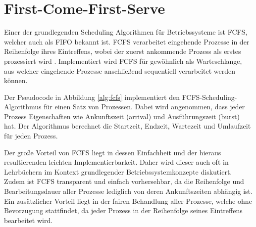 
\section{First-Come-First-Serve}

Einer der grundlegenden Scheduling Algorithmen für Betriebssysteme ist \ac{FCFS}, welcher auch als \ac{FIFO} bekannt ist. \ac{FCFS} verarbeitet eingehende Prozesse in der Reihenfolge ihres Eintreffens, wobei der zuerst ankommende Prozess als erstes prozessiert wird \cite{ANTHONY201621}.
Implementiert wird \ac{FCFS} für gewöhnlich als Warteschlange, aus welcher eingehende Prozesse anschließend sequentiell verarbeitet werden können. 


Der Pseudocode in Abbildung \ref{alg:fcfs} implementiert den \ac{FCFS}-Scheduling-Algorithmus für einen Satz von Prozessen. Dabei wird angenommen, dass jeder Prozess Eigenschaften wie Ankunftszeit (arrival) und Ausführungszeit (burst) hat. Der Algorithmus berechnet die Startzeit, Endzeit, Wartezeit und Umlaufzeit für jeden Prozess. 

Der große Vorteil von \ac{FCFS} liegt in dessen Einfachheit und der hieraus resultierenden leichten Implementierbarkeit. Daher wird dieser auch oft in Lehrbüchern im Kontext grundlegender Betriebssystemkonzepte diskutiert. \cite{silberschatz2018pb} %
Zudem ist \ac{FCFS} transparent und einfach vorhersehbar, da die Reihenfolge und Bearbeitungsdauer aller Prozesse lediglich von deren Ankunftszeiten abhängig ist. Ein zusätzlicher Vorteil liegt in der fairen Behandlung aller Prozesse, welche ohne Bevorzugung stattfindet, da jeder Prozess in der Reihenfolge seines Eintreffens bearbeitet wird. %

